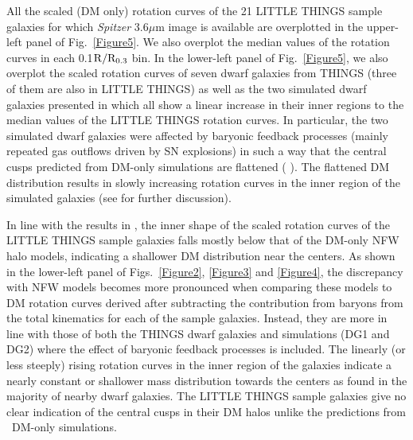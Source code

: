 \documentclass[natbib209]{emulateapj}
\begin{document}
All the scaled (DM only) rotation curves of the 21 LITTLE THINGS sample galaxies
for which {\it Spitzer} 3.6$\mu$m image is available are overplotted in the
upper-left panel of Fig.~\ref{Figure5}. We also overplot the median values of
the rotation curves in each 0.1$\rm R/R_{0.3}$ bin. In the lower-left panel
of Fig.~\ref{Figure5}, we also overplot the scaled rotation 
curves of seven dwarf galaxies from THINGS (three of them are also in LITTLE
THINGS) as well as the two simulated dwarf galaxies presented in
\cite{Governato_2010} which all show a linear increase in their inner regions to
the median values of the LITTLE THINGS rotation curves.
In particular, the two simulated dwarf galaxies
were affected by baryonic feedback processes (mainly repeated gas outflows
driven by SN explosions) in such a way that the central
cusps predicted from DM-only simulations are flattened
(\citeauthor{Governato_2010} \citeyear{Governato_2010}). The flattened DM
distribution results in slowly increasing rotation curves in the inner region of
the simulated galaxies (see \cite{Oh_2011b} for further discussion).

In line with the results in \cite{Oh_2011b}, the
inner shape of the scaled rotation curves of the LITTLE THINGS sample galaxies
falls mostly below that of the DM-only NFW halo models, indicating a
shallower DM distribution near the centers. As shown in the lower-left
panel of Figs.~\ref{Figure2}, \ref{Figure3} and \ref{Figure4}, the discrepancy with NFW models becomes more 
pronounced when comparing these models to DM rotation curves derived after 
subtracting the contribution from baryons from the total
kinematics for each of the sample galaxies. Instead, they are more in line with those
of both the THINGS dwarf galaxies and simulations (DG1 and DG2) where the effect of
baryonic feedback processes is included. The linearly (or less steeply) rising
rotation curves in the inner region of the galaxies indicate a nearly constant
or shallower mass distribution towards the centers as found in the majority of
nearby dwarf galaxies. The LITTLE THINGS sample galaxies give no clear
indication of the central cusps in their DM halos unlike the predictions from
\LCDM\ DM-only simulations. 
\end{document}
